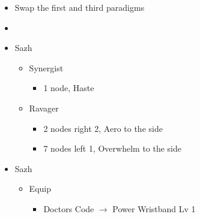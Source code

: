 \begin{menu}
\begin{itemize}
    \paradigm
    \begin{itemize}
        \item Swap the first and third paradigms
        \item {}%
{\paradigmline[1]{\textit{\syn}}{\textit{\sab}}{}}%
{\paradigmline{\com}{\med}{}}%
{\paradigmline{\com}{\rav}{}}%
{\paradigmline{\rav}{\rav}{}}%
{\paradigmline{[\rav]}{(\sab)}{}}%
{\paradigmline{[\com]}{(\sab)}{}}
    \end{itemize}
    \crystarium
    \begin{itemize}
        \item Sazh
        \begin{itemize}
            \item Synergist
            \begin{itemize}
                \item 1 node, Haste
            \end{itemize}
            \item Ravager
            \begin{itemize}
                \item 2 nodes right 2, Aero to the side
                \item 7 nodes left 1, Overwhelm to the side
            \end{itemize}
        \end{itemize}
    \end{itemize}
    \equip
    \begin{itemize}
        \item Sazh
        \begin{itemize}
            \item Equip
            \begin{itemize}
                \item Doctors Code $\rightarrow$ Power Wristband Lv 1
            \end{itemize}
        \end{itemize}
    \end{itemize}
\end{itemize}
\end{menu}

\renewcommand{\first}{[1] Tide Turner (\syn/\sab)}
\renewcommand{\second}{[2] War and Peace (\com/\med)}
\renewcommand{\third}{[3] Slash \& Burn (\com/\rav)}
\renewcommand{\fourth}{[4] Dualcasting (\rav/\rav)}
\renewcommand{\fifth}{[5] Undermine (\rav/\sab)}
\renewcommand{\sixth}{[6] Divide \& Conquer (\com/\sab)}

